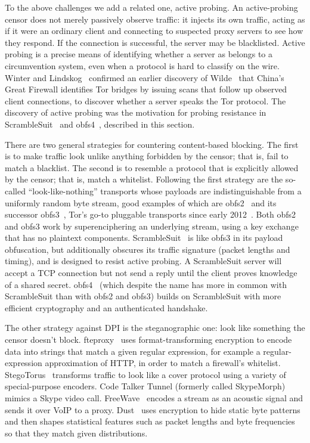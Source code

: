 \documentclass[conference]{IEEEtran}
\begin{document}
To the above challenges we add a related one, active probing.
An active-probing censor does not merely passively observe traffic:
it injects its own traffic,
acting as if it were an ordinary client and connecting to suspected
proxy servers to see how they respond.
If the connection is successful, the server may be blacklisted.
Active probing is a precise means of identifying whether a server as belongs to a circumvention system,
even when a protocol is hard to classify on the wire.
Winter and Lindskog~\cite{foci12-winter} confirmed an earlier discovery of
Wilde~\cite{wilde} that China's Great Firewall identifies Tor bridges
by issuing scans that follow up observed client connections, to discover
whether a server speaks the Tor protocol.
The discovery of active probing was the motivation for probing resistance in ScrambleSuit~\cite{scramblesuit}
and obfs4~\cite{obfs4},
described in this section.


There are two general strategies for countering content-based blocking.
The first is to make traffic look unlike
anything forbidden by the censor; that is, fail to match a blacklist. The second is
to resemble a protocol that is explicitly allowed by the censor; that is, match a whitelist.
Following the first strategy are the so-called ``look-like-nothing'' transports whose
payloads are indistinguishable from a uniformly random byte stream,
good examples of which are
obfs2~\cite{obfs2} and its successor obfs3~\cite{obfs3},
Tor's go-to pluggable transports since early 2012~\cite{obfsproxy-arms-race}.
Both obfs2 and obfs3 work by superenciphering an underlying stream,
using a key exchange that has no plaintext components.
ScrambleSuit~\cite{scramblesuit} is like obfs3 in its
payload obfuscation, but additionally obscures its traffic signature
(packet lengths and timing), and is designed to resist active probing.
A ScrambleSuit server will accept a TCP connection but not send a reply
until the client proves knowledge of a shared secret.
obfs4~\cite{obfs4}
(which despite the name has more in common with ScrambleSuit than with obfs2 and obfs3)
builds on ScrambleSuit with more efficient cryptography and an authenticated handshake.

The other strategy against DPI is the steganographic one: look like
something the censor doesn't block.
fteproxy~\cite{fte} uses format-transforming encryption to encode data into strings
that match a given regular expression,
for example a regular-expression approximation of HTTP,
in order to match a firewall's whitelist.
StegoTorus~\cite{stegotorus}
transforms traffic to look like a cover protocol
using a variety of special-purpose encoders.
Code Talker
Tunnel (formerly called SkypeMorph)~\cite{skypemorph} mimics a Skype video call.
FreeWave~\cite{freewave} encodes a stream as an acoustic signal
and sends it over VoIP to a proxy.
Dust~\cite{dust} uses encryption to hide static byte patterns and then
shapes statistical features such as packet lengths and byte frequencies so that they
match given distributions.
\end{document}
